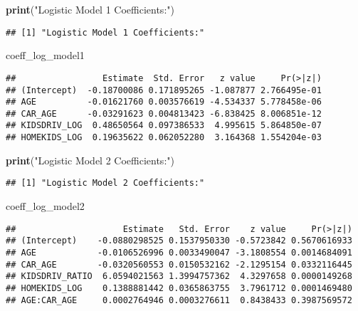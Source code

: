 \documentclass[
]{article}
\newenvironment{Shaded}{\begin{snugshade}}{\end{snugshade}}
\newcommand{\FunctionTok}[1]{\textcolor[rgb]{0.13,0.29,0.53}{\textbf{#1}}}
\newcommand{\NormalTok}[1]{#1}
\newcommand{\StringTok}[1]{\textcolor[rgb]{0.31,0.60,0.02}{#1}}
\begin{document}
\begin{Shaded}
\begin{Highlighting}[]
\FunctionTok{print}\NormalTok{(}\StringTok{"Logistic Model 1 Coefficients:"}\NormalTok{)}
\end{Highlighting}
\end{Shaded}

\begin{verbatim}
## [1] "Logistic Model 1 Coefficients:"
\end{verbatim}

\begin{Shaded}
\begin{Highlighting}[]
\NormalTok{coeff\_log\_model1}
\end{Highlighting}
\end{Shaded}

\begin{verbatim}
##                 Estimate  Std. Error   z value     Pr(>|z|)
## (Intercept)  -0.18700086 0.171895265 -1.087877 2.766495e-01
## AGE          -0.01621760 0.003576619 -4.534337 5.778458e-06
## CAR_AGE      -0.03291623 0.004813423 -6.838425 8.006851e-12
## KIDSDRIV_LOG  0.48650564 0.097386533  4.995615 5.864850e-07
## HOMEKIDS_LOG  0.19635622 0.062052280  3.164368 1.554204e-03
\end{verbatim}

\begin{Shaded}
\begin{Highlighting}[]
\FunctionTok{print}\NormalTok{(}\StringTok{"Logistic Model 2 Coefficients:"}\NormalTok{)}
\end{Highlighting}
\end{Shaded}

\begin{verbatim}
## [1] "Logistic Model 2 Coefficients:"
\end{verbatim}

\begin{Shaded}
\begin{Highlighting}[]
\NormalTok{coeff\_log\_model2}
\end{Highlighting}
\end{Shaded}

\begin{verbatim}
##                     Estimate   Std. Error    z value     Pr(>|z|)
## (Intercept)    -0.0880298525 0.1537950330 -0.5723842 0.5670616933
## AGE            -0.0106526996 0.0033490047 -3.1808554 0.0014684091
## CAR_AGE        -0.0320560553 0.0150532162 -2.1295154 0.0332116445
## KIDSDRIV_RATIO  6.0594021563 1.3994757362  4.3297658 0.0000149268
## HOMEKIDS_LOG    0.1388881442 0.0365863755  3.7961712 0.0001469480
## AGE:CAR_AGE     0.0002764946 0.0003276611  0.8438433 0.3987569572
\end{verbatim}
\end{document}
